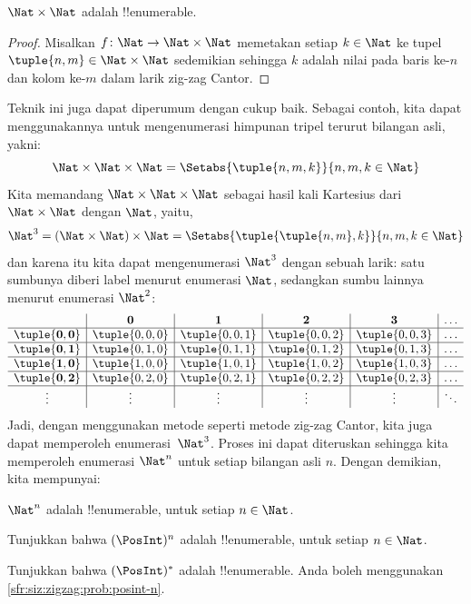 \documentclass[../../../include/open-logic-section]{subfiles}
\begin{document}
\begin{prop}
$\Nat \times \Nat$ adalah !!{enumerable}.
\end{prop}

\begin{proof}
Misalkan $f \colon \Nat \to \Nat\times\Nat$ memetakan setiap $k \in \Nat$
ke tupel $\tuple{n,m} \in \Nat \times \Nat$ sedemikian sehingga $k$ adalah
nilai pada baris ke-$n$ dan kolom ke-$m$ dalam larik zig-zag Cantor.
\end{proof}

\begin{explain}
Teknik ini juga dapat diperumum dengan cukup baik. Sebagai contoh, kita dapat
menggunakannya untuk mengenumerasi himpunan tripel terurut bilangan asli,
yakni:
\[
\Nat \times \Nat \times \Nat = \Setabs{\tuple{n,m,k}}{n,m,k \in \Nat}
\]
Kita memandang $\Nat \times \Nat \times \Nat$ sebagai hasil kali Kartesius
dari $\Nat \times \Nat$ dengan $\Nat$, yaitu,
\[
\Nat^3 = (\Nat \times \Nat) \times \Nat =
\Setabs{\tuple{\tuple{n,m},k}}{n, m, k
  \in \Nat }
\]
dan karena itu kita dapat mengenumerasi $\Nat^3$ dengan sebuah larik: satu
sumbunya diberi label menurut enumerasi $\Nat$, sedangkan sumbu lainnya
menurut enumerasi $\Nat^2$:
\[
\begin{array}{ c | c | c | c | c | c}
& \mathbf 0 & \mathbf 1 & \mathbf 2 & \mathbf 3 & \dots \\
\hline
\mathbf{\tuple{0,0}} & \tuple{0,0,0} & \tuple{0,0,1} & \tuple{0,0,2} & \tuple{0,0,3} & \dots \\
\hline
\mathbf{\tuple{0,1}} & \tuple{0,1,0} & \tuple{0,1,1} & \tuple{0,1,2} & \tuple{0,1,3} & \dots \\
\hline
\mathbf{\tuple{1,0}} & \tuple{1,0,0} & \tuple{1,0,1} & \tuple{1,0,2} & \tuple{1,0,3} & \dots \\
\hline
\mathbf{\tuple{0,2}} & \tuple{0,2,0} & \tuple{0,2,1} & \tuple{0,2,2} & \tuple{0,2,3} & \dots\\
\hline
\vdots & \vdots & \vdots & \vdots & \vdots & \ddots \\
\end{array}
\]
Jadi, dengan menggunakan metode seperti metode zig-zag Cantor, kita juga
dapat memperoleh enumerasi~$\Nat^3$. Proses ini dapat diteruskan sehingga
kita memperoleh enumerasi $\Nat^n$ untuk setiap bilangan asli $n$. Dengan
demikian, kita mempunyai:
\end{explain}

\begin{prop}
$\Nat^n$ adalah !!{enumerable}, untuk setiap $n \in \Nat$.
\end{prop}

\begin{prob}\label{sfr:siz:zigzag:prob:posint-n}
Tunjukkan bahwa $(\PosInt)^n$ adalah !!{enumerable}, untuk setiap $n \in \Nat$.
\end{prob}

\begin{prob}\label{sfr:siz:zigzag:prob:posint-star}
  Tunjukkan bahwa $(\PosInt)^*$ adalah !!{enumerable}. Anda boleh menggunakan
  \cref{sfr:siz:zigzag:prob:posint-n}.
\end{prob}
\end{document}
